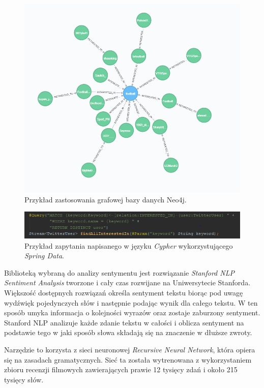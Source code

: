 \begin{figure}[h] %
	\centering
	\includegraphics[width=0.8\linewidth]{img/big_data_neo4j}
	\caption{Przykład zastosowania grafowej bazy danych Neo4j.}
\end{figure}

\begin{figure}[h] %
	\centering
	\includegraphics[width=1.0\linewidth]{img/tools_neo4j_1}
	\caption{Przykład zapytania napisanego w języku \textit{Cypher} wykorzystującego \textit{Spring Data}.}
\end{figure}

Biblioteką wybraną do analizy sentymentu jest rozwiązanie \textit{Stanford NLP Sentiment Analysis} tworzone i cały czas rozwijane na Uniwersytecie Stanforda. Większość dostępnych rozwiązań określa sentyment tekstu biorąc pod uwagę wydźwięk pojedynczych słów i następnie podając wynik dla całego tekstu. W ten sposób umyka informacja o kolejności wyrazów oraz zostaje zaburzony sentyment. Stanford NLP analizuje każde zdanie tekstu w całości i oblicza sentyment na podstawie tego w jaki sposób słowa składają się na znaczenie w dłuższe zwroty. 

Narzędzie to korzysta z sieci neuronowej \textit{Recursive Neural Network}, która opiera się na zasadach gramatycznych. Sieć ta została wytrenowana z wykorzystaniem zbioru recenzji filmowych zawierających prawie 12 tysięcy zdań i około 215 tysięcy słów.

